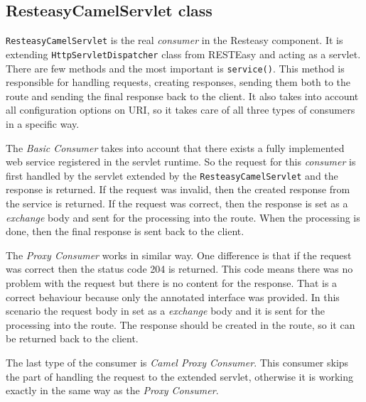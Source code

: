 \documentclass[12pt,final,oneside]{fithesis2}
\begin{document}
\subsection{ResteasyCamelServlet class}\label{servlet}
\texttt{ResteasyCamelServlet} is the real \textit{consumer} in the Resteasy component. It is extending \texttt{HttpServletDispatcher} class from RESTEasy and acting as a servlet. There are few methods and the most important is \texttt{service()}. This method is responsible for handling requests, creating responses, sending them both to the route and sending the final response back to the client. It also takes into account all configuration options on URI, so it takes care of all three types of consumers in a specific way. 

The \textit{Basic Consumer} takes into account that there exists a fully implemented web service registered in the servlet runtime. So the request for this \textit{consumer} is first handled by the servlet extended by the \texttt{ResteasyCamelServlet} and the response is returned. If the request was invalid, then the created response from the service is returned. If the request was correct, then the response is set as a \textit{exchange} body and sent for the processing into the route. When the processing is done, then the final response is sent back to the client. 

The \textit{Proxy Consumer} works in similar way. One difference is that if the request was correct then the status code 204 is returned. This code means there was no problem with the request but there is no content for the response\cite{http}. That is a correct behaviour because only the annotated interface was provided. In this scenario the request body in set as a \textit{exchange} body and it is sent for the processing into the route. The response should be created in the route, so it can be returned back to the client.


The last type of the consumer is \textit{Camel Proxy Consumer}. This consumer skips the part of handling the request to the extended servlet, otherwise it is working exactly in the same way as the \textit{Proxy Consumer}.     
\end{document}
